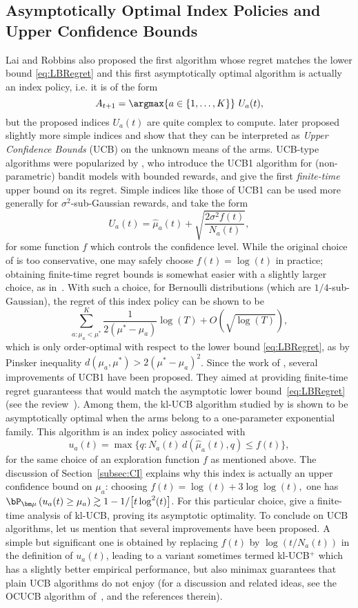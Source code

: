 \documentclass[proc]{edpsmath}
\begin{document}
	\subsection{Asymptotically Optimal Index Policies and Upper Confidence Bounds}
	
	Lai and Robbins also proposed the first algorithm whose regret matches the lower bound \eqref{eq:LBRegret} and this first asymptotically optimal algorithm is actually an index policy, i.e. it is of the form  
	\[A_{t+1} = \argmax{a \in \{1,\dots,K\}} \ U_a(t),\]
	but the proposed indices $U_a(t)$ are quite complex to compute. \cite{Agrawal:95,KatRob:95Gauss} later proposed slightly more simple indices and show that they can be interpreted as \emph{Upper Confidence Bounds} (UCB) on the unknown means of the arms. UCB-type algorithms were popularized by \cite{Aueral02}, who introduce the UCB1 algorithm for (non-parametric) bandit models with bounded rewards, and give the first \emph{finite-time} upper bound on its regret. Simple indices like those of UCB1 can be used more generally for $\sigma^2$-sub-Gaussian rewards, and take the form 
	\[U_a(t) = \hat{\mu}_a(t) + \sqrt{\frac{2\sigma^2f(t)}{N_a(t)}},\]
	for some function $f$ which controls the confidence level. While the original choice of \cite{Aueral02} is too conservative, one may safely choose  $f(t)=\log(t)$ in practice; obtaining finite-time regret bounds is somewhat easier with a slightly larger choice, as in~\cite{AOKLUCB}. With such a choice, for Bernoulli distributions (which are $1/4$-sub-Gaussian), the regret of this index policy can be shown to be   
	\[\sum_{a : \mu_a < \mu^*}^K \frac{1}{2(\mu^*-\mu_a)} \log(T) + O(\sqrt{\log(T)}),\]
	which is only order-optimal with respect to the lower bound \eqref{eq:LBRegret}, as by Pinsker inequality $d(\mu_a,\mu^*) > 2(\mu^*-\mu_a)^2$. Since the work of \cite{Aueral02}, several improvements of UCB1 have been proposed. They aimed at providing finite-time regret guaranteess that would match the asymptotic lower bound~\eqref{eq:LBRegret} (see the review~\cite{Bubeck:Survey12}). Among them, the kl-UCB algorithm studied by \cite{KLUCBJournal} is shown to be asymptotically optimal when the arms belong to a one-parameter exponential family. This algorithm is an index policy associated with 
	\[u_a(t) = \max \big\{ q : N_a(t)\, d(\hat{\mu}_a(t), q) \leq f(t) \big\},\]
	for the same choice of an exploration function $f$ as mentioned above. The discussion of Section~\ref{subsec:CI} explains why this index is actually an upper confidence bound on $\mu_a$: choosing $f(t) = \log(t) + 3\log\log(t),$ one has $\bP_{\bm \mu}\left(u_a(t) \geq \mu_a\right) \gtrsim 1 - 1/\big[t\log^{2}(t)\big]$. For this particular choice, \cite{KLUCBJournal} give a finite-time analysis of kl-UCB, proving its asymptotic optimality. To conclude on UCB algorithms, let us mention that several improvements have been proposed. A simple but significant one is obtained by replacing $f(t)$ by $\log(t/N_a(t))$ in the definition of $u_a(t)$, leading to a variant sometimes termed kl-UCB$^+$ which has a slightly better empirical performance, but also minimax guarantees that plain UCB algorithms do not enjoy (for a discussion and related ideas, see the OCUCB algorithm of~\cite{L16}, \cite{MG17} and the references therein). 
\end{document}
